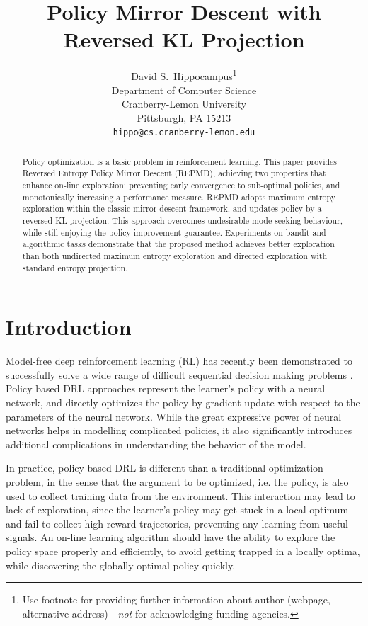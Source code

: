 \documentclass{article}
\title{Policy Mirror Descent with Reversed KL Projection}
\author{
  David S.~Hippocampus\thanks{Use footnote for providing further
    information about author (webpage, alternative
    address)---\emph{not} for acknowledging funding agencies.} \\
  Department of Computer Science\\
  Cranberry-Lemon University\\
  Pittsburgh, PA 15213 \\
  \texttt{hippo@cs.cranberry-lemon.edu} \\
}
\begin{document}

\maketitle

\begin{abstract}
Policy optimization is a basic problem in reinforcement learning. This paper provides Reversed Entropy Policy Mirror Descent (REPMD), achieving two properties that enhance on-line exploration: preventing early convergence to  sub-optimal policies, and monotonically increasing a performance measure. REPMD adopts maximum entropy exploration within the classic mirror descent framework, and updates policy by a reversed KL projection. This approach overcomes undesirable mode seeking behaviour, while still enjoying the policy improvement guarantee. Experiments on bandit and algorithmic tasks demonstrate that the proposed method achieves better exploration than both undirected maximum entropy exploration and directed exploration with standard entropy projection.%
\end{abstract}

\section{Introduction}
Model-free deep reinforcement learning (RL) has recently been demonstrated to successfully solve a wide range of difficult sequential decision making problems \cite{schulman2015trust,mnih2015human,silver2016mastering}. Policy based DRL approaches represent the learner's policy with a neural network, and directly optimizes the policy by gradient update with respect to the parameters of the neural network. While the great expressive power of neural networks helps in modelling complicated policies, it also significantly introduces additional complications in understanding the behavior of the model. 

In practice, policy based DRL is different than a traditional optimization problem, in the sense that the argument to be optimized, i.e. the policy, is also used to collect training data from the environment. This interaction may lead to lack of exploration, since the learner's policy may get stuck in a local optimum and fail to collect high reward trajectories, preventing any learning from useful signals.  An on-line learning algorithm should have the ability to explore the policy space properly and efficiently, to avoid getting trapped in a locally optima, while discovering the globally optimal policy quickly.
\end{document}
